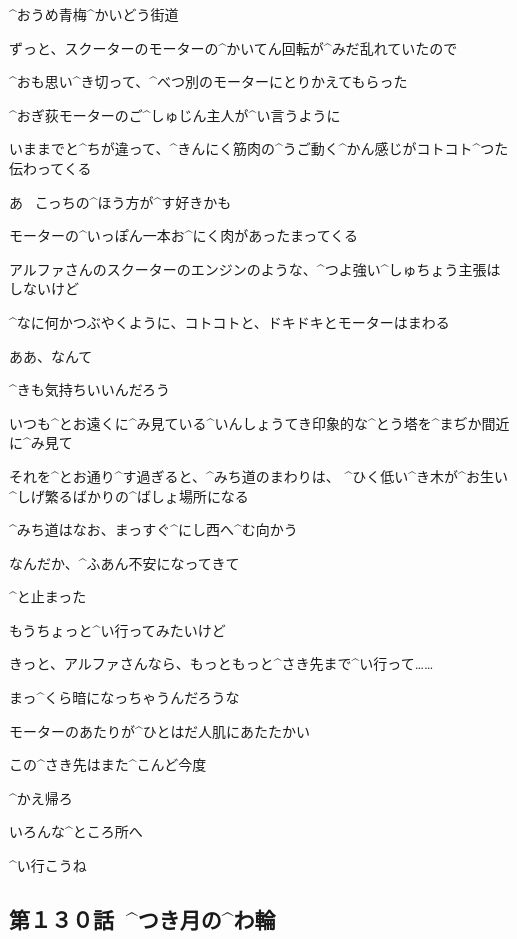 \page
\Sign ^{おうめ}{青梅}^{かいどう}{街道}

\K ずっと、スクーターのモーターの^{かいてん}{回転}が^{みだ}{乱}れていたので

\K ^{おも}{思}い^{き}{切}って、^{べつ}{別}のモーターにとりかえてもらった

\K ^{おぎ}{荻}モーターのご^{しゅじん}{主人}が^{い}{言}うように

\K いままでと^{ちが}{違}って、^{きんにく}{筋肉}の^{うご}{動}く^{かん}{感}じがコトコト^{つた}{伝}わってくる

\K あ
\ こっちの^{ほう}{方}が^{す}{好}きかも

\page
\K モーターの^{いっぽん}{一本}お^{にく}{肉}があったまってくる

\K アルファさんのスクーターのエンジンのような、^{つよ}{強}い^{しゅちょう}{主張}はしないけど

\K ^{なに}{何}かつぶやくように、コトコトと、ドキドキとモーターはまわる

\page
\K ああ、なんて

\K ^{きも}{気持}ちいいんだろう

\page
\K いつも^{とお}{遠}くに^{み}{見}ている^{いんしょうてき}{印象的}な^{とう}{塔}を^{まぢか}{間近}に^{み}{見}て

\page
\K それを^{とお}{通}り^{す}{過}ぎると、^{みち}{道}のまわりは、
^{ひく}{低}い^{き}{木}が^{お}{生}い^{しげ}{繁}るばかりの^{ばしょ}{場所}になる

\K ^{みち}{道}はなお、まっすぐ^{にし}{西}へ^{む}{向}かう

\page[143]
\K なんだか、^{ふあん}{不安}になってきて

\K ^{と}{止}まった

\K もうちょっと^{い}{行}ってみたいけど

\page
\K きっと、アルファさんなら、もっともっと^{さき}{先}まで^{い}{行}って……

\K まっ^{くら}{暗}になっちゃうんだろうな

\K モーターのあたりが^{ひとはだ}{人肌}にあたたかい

\page
\K この^{さき}{先}はまた^{こんど}{今度}

\K ^{かえ}{帰}ろ

\page
\K いろんな^{ところ}{所}へ

\K ^{い}{行}こうね


\subsection{第１３０話\ ^{つき}{月}の^{わ}{輪}}

